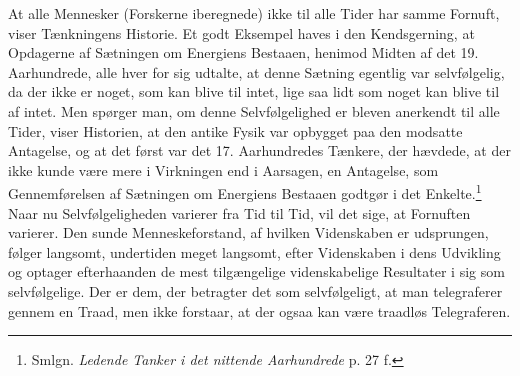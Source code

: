 \documentclass[12pt]{article}
\newcommand{\opage}[1]{\marginnote{\footnotesize\textit{[#1]}}}
\begin{document}
At alle Mennesker (Forskerne iberegnede) ikke til alle Tider har samme
\guillemotright{}Fornuft\guillemotleft{}, viser Tænkningens Historie. Et godt Eksempel haves i den
Kendsgerning, at Opdagerne af Sætningen om Energiens Bestaaen,
henimod Midten af det 19. Aarhundrede, alle hver for sig udtalte, at
denne Sætning egentlig var selvfølgelig, da der ikke er noget, som kan
blive til intet, lige saa lidt som noget kan blive til af intet. Men
spørger man, om denne Selvfølgelighed er bleven anerkendt til alle
Tider, viser Historien, at den antike Fysik var opbygget paa den
modsatte Antagelse, og at det først var det 17. Aarhundredes Tænkere,
der hævdede, at der ikke kunde være mere i Virkningen end i Aarsagen,
en Antagelse, som Gennemførelsen af Sætningen om Energiens Bestaaen
godtgør i det Enkelte.\footnote{Smlgn. \textit{Ledende Tanker i det
nittende Aarhundrede} p. 27 f.} Naar nu \guillemotright{}Selvfølgeligheden\guillemotleft{} varierer
fra Tid til Tid, vil det sige, at \guillemotright{}Fornuften\guillemotleft{} varierer. Den sunde
Menneskeforstand, af hvilken Videnskaben er udsprungen, følger
langsomt, undertiden meget langsomt, efter Videnskaben i dens Udvikling
og optager efterhaanden de mest tilgængelige videnskabelige
\setcounter{footnote}{0}%
\opage{14}Resultater i sig som selvfølgelige. Der er dem, der betragter det
som selvfølgeligt, at man telegraferer gennem en Traad, men ikke
forstaar, at der ogsaa kan være traadløs Telegraferen.
\end{document}

